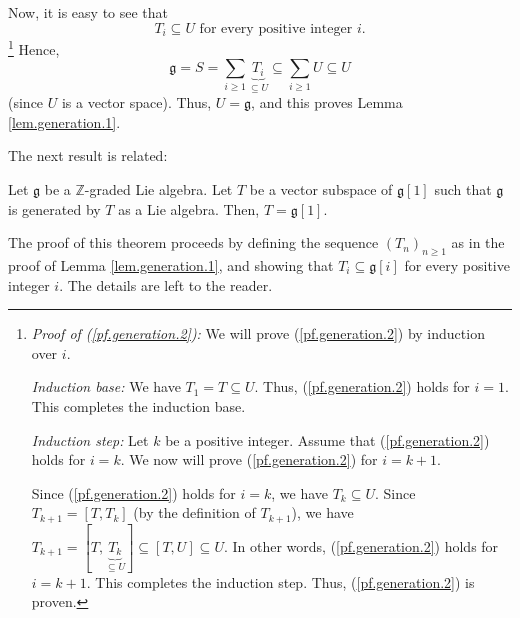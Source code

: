 \documentclass[etingof-lie.tex]{subfiles}
\begin{document}
Now, it is easy to see that%
\begin{equation}
T_{i}\subseteq U\text{ for every positive integer }i. \label{pf.generation.2}%
\end{equation}
\footnote{\textit{Proof of (\ref{pf.generation.2}):} We will prove
(\ref{pf.generation.2}) by induction over $i$.
\par
\textit{Induction base:} We have $T_{1}=T\subseteq U$. Thus,
(\ref{pf.generation.2}) holds for $i=1$. This completes the induction base.
\par
\textit{Induction step:} Let $k$ be a positive integer. Assume that
(\ref{pf.generation.2}) holds for $i=k$. We now will prove
(\ref{pf.generation.2}) for $i=k+1$.
\par
Since (\ref{pf.generation.2}) holds for $i=k$, we have $T_{k}\subseteq U$.
Since $T_{k+1}=\left[  T,T_{k}\right]  $ (by the definition of $T_{k+1}$), we
have $T_{k+1}=\left[  T,\underbrace{T_{k}}_{\subseteq U}\right]
\subseteq\left[  T,U\right]  \subseteq U$. In other words,
(\ref{pf.generation.2}) holds for $i=k+1$. This completes the induction step.
Thus, (\ref{pf.generation.2}) is proven.} Hence,%
\[
\mathfrak{g}=S=\sum\limits_{i\geq1}\underbrace{T_{i}}_{\subseteq U}%
\subseteq\sum\limits_{i\geq1}U\subseteq U
\]
(since $U$ is a vector space). Thus, $U=\mathfrak{g}$, and this proves Lemma
\ref{lem.generation.1}.

The next result is related:

\begin{theorem}
\label{thm.FreeLie.grading1}Let $\mathfrak{g}$ be a $\mathbb{Z}$-graded Lie
algebra. Let $T$ be a vector subspace of $\mathfrak{g}\left[  1\right]  $ such
that $\mathfrak{g}$ is generated by $T$ as a Lie algebra. Then,
$T=\mathfrak{g}\left[  1\right]  $.
\end{theorem}

\begin{vershort}
The proof of this theorem proceeds by defining the sequence $\left(
T_{n}\right)  _{n\geq1}$ as in the proof of Lemma \ref{lem.generation.1}, and
showing that $T_{i}\subseteq\mathfrak{g}\left[  i\right]  $ for every positive
integer $i$. The details are left to the reader.
\end{vershort}
\end{document}
